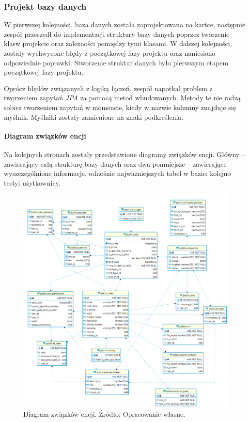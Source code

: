 \documentclass[twoside]{projektInzynierskiMS}
\numberwithin{figure}{section}
\begin{document}
\subsubsection{Projekt bazy danych}
W pierwszej kolejności, baza danych została zaprojektowana na kartce, następnie zespół przeszedł do implementacji struktury bazy danych poprzez tworzenie klas\linebreak w projekcie oraz zależności pomiędzy tymi klasami. W dalszej kolejności, zostały wychwycone błędy z początkowej fazy projektu oraz naniesiono odpowiednie poprawki. Stworzenie struktur danych było pierwszym etapem początkowej fazy projektu.

Oprócz błędów związanych z logiką łączeń, zespół napotkał problem z tworzeniem zapytań \textit{JPA} za pomocą metod wbudowanych. Metody te nie radzą sobie\linebreak z tworzeniem zapytań w momencie, kiedy w nazwie kolumny znajduje się myślnik. Myślniki zostały zamienione na znaki podkreślenia.

\paragraph{Diagram związków encji}
\!

Na kolejnych stronach zostały przedstawione diagramy związków encji. Główny – zawierający całą strukturę bazy danych oraz dwa pomniejsze – zawierające wyszczególnione informacje, odnośnie najważniejszych tabel w bazie: kolejno testy\linebreak i użytkownicy.

\begin{figure}[h!]
    \centering
    \includegraphics[width=\textwidth]{images/baza.png}
    \caption{Diagram związków encji. Źródło: Opracowanie własne.}
    \label{fig:baza}
\end{figure}
\end{document}
